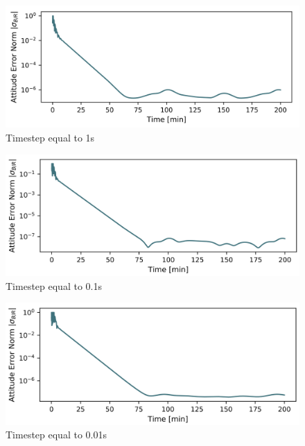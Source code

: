 \begin{figure}[htb]
	\centerline{
	\includegraphics[scale=0.3]{Figures/att_norm1.png}
	}
	\caption{Timestep equal to 1s}
	\label{fig:att_error1}
\end{figure}

\begin{figure}[htb]
	\centerline{
	\includegraphics[scale=0.3]{Figures/att_norm2.png}
	}
	\caption{Timestep equal to 0.1s}
	\label{fig:att_error2}
\end{figure}

\begin{figure}[!htb]
	\centerline{
	\includegraphics[scale=0.3]{Figures/att_norm3.png}
	}
	\caption{Timestep equal to 0.01s}
	\label{fig:att_error3}
\end{figure}



